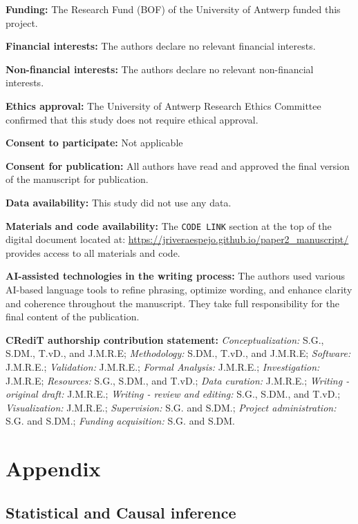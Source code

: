 \documentclass[
  authoryear,
  review,
  1p]{elsarticle}
\begin{document}
\textbf{Funding:} The Research Fund (BOF) of the University of Antwerp
funded this project.

\textbf{Financial interests:} The authors declare no relevant financial
interests.

\textbf{Non-financial interests:} The authors declare no relevant
non-financial interests.

\textbf{Ethics approval:} The University of Antwerp Research Ethics
Committee confirmed that this study does not require ethical approval.

\textbf{Consent to participate:} Not applicable

\textbf{Consent for publication:} All authors have read and approved the
final version of the manuscript for publication.

\textbf{Data availability:} This study did not use any data.

\textbf{Materials and code availability:} The \texttt{CODE\ LINK}
section at the top of the digital document located at:
\url{https://jriveraespejo.github.io/paper2_manuscript/} provides access
to all materials and code.

\textbf{AI-assisted technologies in the writing process:} The authors
used various AI-based language tools to refine phrasing, optimize
wording, and enhance clarity and coherence throughout the manuscript.
They take full responsibility for the final content of the publication.

\textbf{CRediT authorship contribution statement:}
\emph{Conceptualization:} S.G., S.DM., T.vD., and J.M.R.E;
\emph{Methodology:} S.DM., T.vD., and J.M.R.E; \emph{Software:}
J.M.R.E.; \emph{Validation:} J.M.R.E.; \emph{Formal Analysis:} J.M.R.E.;
\emph{Investigation:} J.M.R.E; \emph{Resources:} S.G., S.DM., and T.vD.;
\emph{Data curation:} J.M.R.E.; \emph{Writing - original draft:}
J.M.R.E.; \emph{Writing - review and editing:} S.G., S.DM., and T.vD.;
\emph{Visualization:} J.M.R.E.; \emph{Supervision:} S.G. and S.DM.;
\emph{Project administration:} S.G. and S.DM.; \emph{Funding
acquisition:} S.G. and S.DM.

\newpage{}

\section{Appendix}\label{sec-appendix}

\subsection{Statistical and Causal inference}\label{sec-appendixB}
\end{document}
